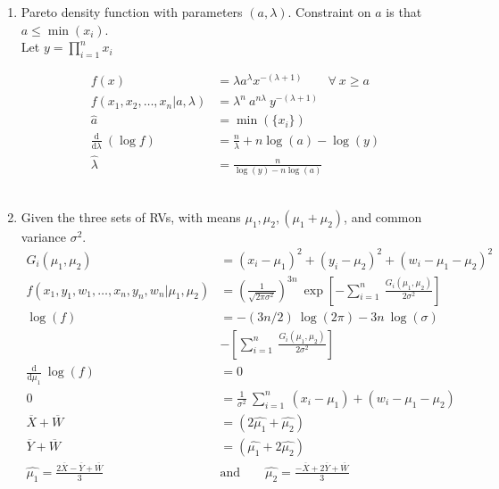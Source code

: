 \begin{enumerate}
	\item Pareto density function with parameters $ (a, \lambda) $. Constraint on $ a $ is that $ a \leq \min({x_i}) $. \\
	Let $ y = \prod\limits_{i=1}^{n} x_i $
	
	
		\begin{align}
			f(x) &= \lambda a^\lambda x^{-(\lambda+1)} \qquad \forall\ x \geq a \nonumber \\
			f(x_1, x_2, \dots, x_n | a, \lambda) &= \lambda^n\ a^{n\lambda}\ y^{-(\lambda + 1)} \\
			\widehat{a} &= \min(\{x_i\}) \\
			\frac{\mathrm{d}}{\mathrm{d} \lambda}\ (\log f) &= \frac{n}{\lambda} + n \log (a) - \log (y) \nonumber \\
			\widehat{\lambda} &= \frac{n}{\log (y) - n \log (a)}
		\end{align}\\
	
	
	\item Given the three sets of RVs, with means $ \mu_1, \mu_2, (\mu_1 + \mu_2) $, and common variance $ \sigma^2 $. \\
	
	
		\begin{align}
			G_i(\mu_1, \mu_2) &= (x_i - \mu_1)^2 + (y_i - \mu_2)^2 + (w_i - \mu_1 - \mu_2)^2 \nonumber \\
			f(x_1, y_1,w_1, \dots, x_n, y_n, w_n | \mu_1, \mu_2) &= \left(\frac{1}{\sqrt{2\pi\sigma^2}}\right)^{3n}\ \exp \left[-\sum\limits_{i=1}^{n}\ \frac{G_i(\mu_1, \mu_2)}{2\sigma^2}\right] \nonumber \\
			\log(f) &= -(3n/2)\ \log(2\pi) - 3n\ \log(\sigma) \nonumber \\
			&- \left[\sum\limits_{i=1}^{n}\ \frac{G_i(\mu_1, \mu_2)}{2\sigma^2}\right] \\
			\frac{\mathrm{d}}{\mathrm{d} \mu_1}\ \log(f) &= 0 \nonumber \\
			0 &= \frac{1}{\sigma^2}\ \sum\limits_{i=1}^{n}\ (x_i - \mu_1) + (w_i - \mu_1 - \mu_2) \nonumber \\
			\overline{X} + \overline{W} &= (2\widehat{\mu_1} + \widehat{\mu_2}) \\
			\overline{Y} + \overline{W} &= (\widehat{\mu_1} + 2\widehat{\mu_2}) \nonumber \\
			\widehat{\mu_1} = \frac{2\overline{X} - \overline{Y} + \overline{W}}{3} \qquad &\text{and} \qquad \widehat{\mu_2} = \frac{-\overline{X} + 2\overline{Y} + \overline{W}}{3}
		\end{align} \\
	

\end{enumerate}
